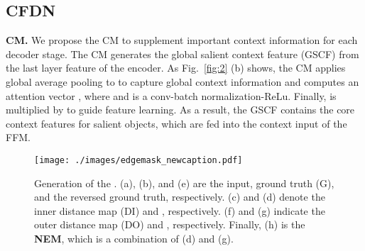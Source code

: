 \documentclass{article}
\begin{document}
\vspace{-0.2cm}
\label{sec:method}
\subsection{CFDN}
\noindent
\textbf{CM.} We propose the CM to supplement important context information for each decoder stage. The CM generates the global salient context feature (GSCF)  from the last layer feature  of the encoder. As Fig.~\ref{fig:2} (b) shows, the CM applies global average pooling to  to capture global context information and computes an attention vector , where  and  is a  conv-batch normalization-ReLu. Finally,  is multiplied by  to guide feature learning. As a result, the GSCF contains the core context features for salient objects, which are fed into the context input of the FFM.

\begin{figure}[t]
    \begin{minipage}[b]{1.0\linewidth}
      \centering
      \centerline{\texttt{[image: ./images/edgemask\_newcaption.pdf]}}
    \end{minipage}
    \vspace{-0.7cm}
    \caption{Generation of the . (a), (b), and (e) are the input, ground truth (G), and the reversed ground truth, respectively. (c) and (d) denote the inner distance map (DI) and , respectively. (f) and (g) indicate the outer distance map (DO) and , respectively. Finally, (h) is the \textbf{NEM}, which is a combination of (d) and (g).}
    \vspace{-0.5cm}
    \label{fig:edgeMask}
\end{figure}
\end{document}
